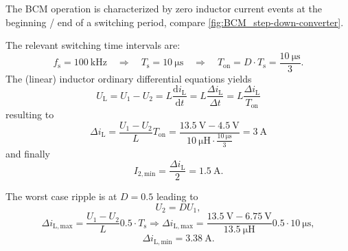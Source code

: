 \begin{solutionblock}
The BCM operation is characterized by zero inductor current events at the beginning / end of a switching period, compare \autoref{fig:BCM_step-down-converter}.

    

    The relevant switching time intervals are:
    \begin{equation}
        f_\mathrm{s} = \SI{ 100}{\kilo\hertz} \quad \Rightarrow \quad T_\mathrm{s} = \SI{ 10}{\micro\second} \quad \Rightarrow \quad T_\mathrm{on} = D \cdot T_\mathrm{s} = \frac{\SI{ 10}{\micro \second}}{3}.
    \end{equation}
    The (linear) inductor ordinary differential equations yields
    \begin{equation}
        U_\mathrm{L} = U_\mathrm{1} - U_\mathrm{2} = L \frac{\mathrm{d} i_\mathrm{L}}{\mathrm{d}t}  = L \frac{\Delta i_\mathrm{L}}{\Delta t} = L \frac{\Delta i_\mathrm{L}}{T_\mathrm{on}}
    \end{equation}
    resulting to
    \begin{equation}
        \Delta i_\mathrm{L} = \frac{U_\mathrm{1} - U_\mathrm{2}}{L} T_\mathrm{on} = \frac{\SI{13.5}{\volt} - \SI{4.5}{\volt}}{\SI{10}{\micro \henry} \cdot \frac{\SI{10}{\micro \second}}{3}} = \SI{3}{\ampere}
    \end{equation}
    and finally
    \begin{equation}
        I_{\mathrm{2,min}} = \frac{\Delta i_\mathrm{L}}{2} = \SI{1.5}{\ampere}.
    \end{equation}
\end{solutionblock}

\begin{solutionblock}
    The worst case ripple is at $D=0.5$ leading to
    \begin{equation}
        U_\mathrm{2} = D U_\mathrm{1},
    \end{equation}
    \begin{equation}
        \Delta i_\mathrm{L,max} = \frac{U_\mathrm{1} - U_\mathrm{2}}{L} 0.5 \cdot T_\mathrm{s}
        \Rightarrow \Delta i_\mathrm{L,max} = \frac{\SI{13.5}{\volt} - \SI{6.75}{\volt}}{\SI{13.5}{\micro \henry}} 0.5 \cdot \SI{10}{\micro \second},
    \end{equation}
    \begin{equation}
        \Delta i_{\mathrm{L,min}} = \SI{3.38}{\ampere}.
    \end{equation}
\end{solutionblock}

